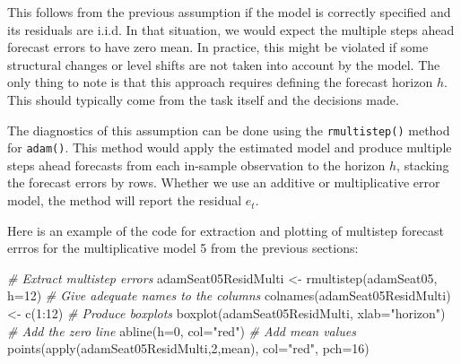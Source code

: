 \documentclass[
]{book}
\newenvironment{Shaded}{\begin{snugshade}}{\end{snugshade}}
\newcommand{\AttributeTok}[1]{\textcolor[rgb]{0.77,0.63,0.00}{#1}}
\newcommand{\CommentTok}[1]{\textcolor[rgb]{0.56,0.35,0.01}{\textit{#1}}}
\newcommand{\DecValTok}[1]{\textcolor[rgb]{0.00,0.00,0.81}{#1}}
\newcommand{\FunctionTok}[1]{\textcolor[rgb]{0.00,0.00,0.00}{#1}}
\newcommand{\NormalTok}[1]{#1}
\newcommand{\OtherTok}[1]{\textcolor[rgb]{0.56,0.35,0.01}{#1}}
\newcommand{\SpecialCharTok}[1]{\textcolor[rgb]{0.00,0.00,0.00}{#1}}
\newcommand{\StringTok}[1]{\textcolor[rgb]{0.31,0.60,0.02}{#1}}
\theoremstyle{definition}
\theoremstyle{definition}
\theoremstyle{definition}
\theoremstyle{definition}
\theoremstyle{remark}
\begin{document}
This follows from the previous assumption if the model is correctly specified and its residuals are i.i.d. In that situation, we would expect the multiple steps ahead forecast errors to have zero mean. In practice, this might be violated if some structural changes or level shifts are not taken into account by the model. The only thing to note is that this approach requires defining the forecast horizon \(h\). This should typically come from the task itself and the decisions made.

The diagnostics of this assumption can be done using the \texttt{rmultistep()} method for \texttt{adam()}. This method would apply the estimated model and produce multiple steps ahead forecasts from each in-sample observation to the horizon \(h\), stacking the forecast errors by rows. Whether we use an additive or multiplicative error model, the method will report the residual \(e_t\).

Here is an example of the code for extraction and plotting of multistep forecast errros for the multiplicative model 5 from the previous sections:

\begin{Shaded}
\begin{Highlighting}[]
\CommentTok{\# Extract multistep errors}
\NormalTok{adamSeat05ResidMulti }\OtherTok{\textless{}{-}} \FunctionTok{rmultistep}\NormalTok{(adamSeat05, }\AttributeTok{h=}\DecValTok{12}\NormalTok{)}
\CommentTok{\# Give adequate names to the columns}
\FunctionTok{colnames}\NormalTok{(adamSeat05ResidMulti) }\OtherTok{\textless{}{-}} \FunctionTok{c}\NormalTok{(}\DecValTok{1}\SpecialCharTok{:}\DecValTok{12}\NormalTok{)}
\CommentTok{\# Produce boxplots}
\FunctionTok{boxplot}\NormalTok{(adamSeat05ResidMulti, }\AttributeTok{xlab=}\StringTok{"horizon"}\NormalTok{)}
\CommentTok{\# Add the zero line}
\FunctionTok{abline}\NormalTok{(}\AttributeTok{h=}\DecValTok{0}\NormalTok{, }\AttributeTok{col=}\StringTok{"red"}\NormalTok{)}
\CommentTok{\# Add mean values}
\FunctionTok{points}\NormalTok{(}\FunctionTok{apply}\NormalTok{(adamSeat05ResidMulti,}\DecValTok{2}\NormalTok{,mean), }\AttributeTok{col=}\StringTok{"red"}\NormalTok{, }\AttributeTok{pch=}\DecValTok{16}\NormalTok{)}
\end{Highlighting}
\end{Shaded}
\end{document}
